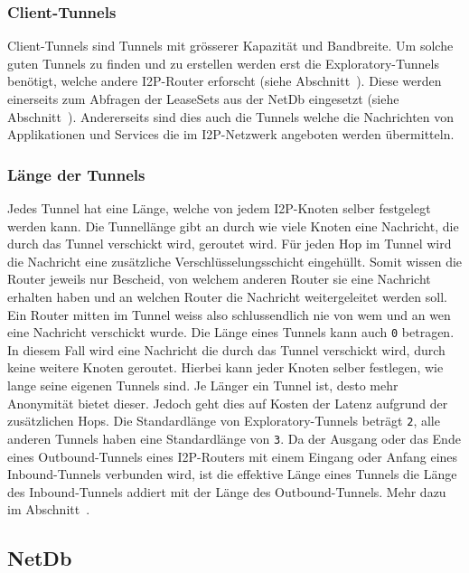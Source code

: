 \subsubsection{Client-Tunnels}

Client-Tunnels sind Tunnels mit grösserer Kapazität und Bandbreite. Um solche guten Tunnels zu finden und zu erstellen werden erst die Exploratory-Tunnels benötigt, welche andere I2P-Router erforscht (siehe Abschnitt~).
Diese werden einerseits zum Abfragen der LeaseSets aus der NetDb eingesetzt (siehe Abschnitt~).
Andererseits sind dies auch die Tunnels welche die Nachrichten von Applikationen und Services die im I2P-Netzwerk angeboten werden übermitteln.
\parencites[S.~4]{conrad_survey_2014}{noauthor_tunnelimplementierung_nodate}

\subsubsection{Länge der Tunnels}

Jedes Tunnel hat eine Länge, welche von jedem I2P-Knoten selber festgelegt werden kann.
Die Tunnellänge gibt an durch wie viele Knoten eine Nachricht, die durch das Tunnel verschickt wird, geroutet wird.
Für jeden Hop im Tunnel wird die Nachricht eine zusätzliche Verschlüsselungsschicht eingehüllt.
Somit wissen die Router jeweils nur Bescheid, von welchem anderen Router sie eine Nachricht erhalten haben und an welchen Router die Nachricht weitergeleitet werden soll.
Ein Router mitten im Tunnel weiss also schlussendlich nie von wem und an wen eine Nachricht verschickt wurde.
Die Länge eines Tunnels kann auch \lstinline|0| betragen.
In diesem Fall wird eine Nachricht die durch das Tunnel verschickt wird, durch keine weitere Knoten geroutet.
Hierbei kann jeder Knoten selber festlegen, wie lange seine eigenen Tunnels sind.
Je Länger ein Tunnel ist, desto mehr Anonymität bietet dieser.
Jedoch geht dies auf Kosten der Latenz aufgrund der zusätzlichen Hops.
Die Standardlänge von Exploratory-Tunnels beträgt \lstinline|2|, alle anderen Tunnels haben eine Standardlänge von \lstinline|3|.
Da der Ausgang oder das Ende eines Outbound-Tunnels eines I2P-Routers mit einem Eingang oder Anfang eines Inbound-Tunnels verbunden wird,
ist die effektive Länge eines Tunnels die Länge des Inbound-Tunnels addiert mit der Länge des Outbound-Tunnels. Mehr dazu im Abschnitt~.
\parencite{noauthor_i2p_nodate-3}

\subsection{NetDb}\label{sec:netdb}

